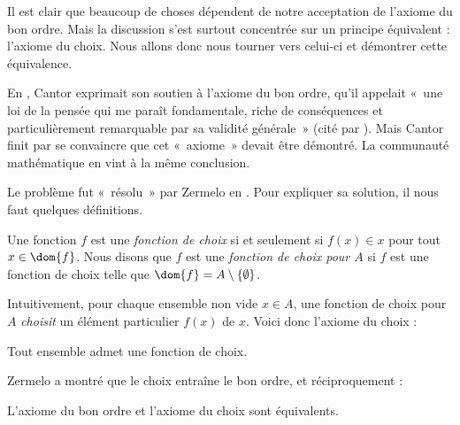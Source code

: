 \documentclass[../../../include/open-logic-section]{subfiles}
\begin{document}

Il est clair que beaucoup de choses dépendent
de notre acceptation de l'axiome du bon ordre.
Mais la discussion s'est surtout concentrée
sur un principe équivalent : l'axiome du choix.
Nous allons donc nous tourner vers celui-ci
et démontrer cette équivalence.

En \citeyear{Cantor1883}, Cantor exprimait
son soutien à l'axiome du bon ordre, qu'il
appelait «~une loi de la pensée qui me
paraît fondamentale, riche de conséquences
et particulièrement remarquable par sa
validité générale~» (cité par
\citeauthor{Potter2004}
\citeyear[p.~243]{Potter2004}).
Mais Cantor finit par se convaincre
que cet «~axiome~» devait être démontré.
La communauté mathématique en vint
à la même conclusion.

Le problème fut «~résolu~» par Zermelo
en \citeyear{Zermelo1904}. Pour expliquer
sa solution, il nous faut quelques définitions.

\begin{defn}
Une fonction $f$ est une \emph{fonction de choix}
si et seulement si $f(x) \in x$ pour tout
$x \in \dom{f}$. Nous disons que $f$ est
une \emph{fonction de choix pour $A$} si
$f$ est une fonction de choix telle que
$\dom{f} = A \setminus \{\emptyset\}$.
\end{defn}

Intuitivement, pour chaque ensemble non vide
$x \in A$, une fonction de choix pour $A$
\emph{choisit} un élément particulier
$f(x)$ de $x$. Voici donc l'axiome du choix :

\begin{axiom}[Choix]
	Tout ensemble admet une fonction de choix.
\end{axiom}

Zermelo a montré que le choix entraîne
le bon ordre, et réciproquement :

\begin{thm}[dans $\ZF$]
L'axiome du bon ordre et l'axiome du choix
sont équivalents.
\end{thm}
\end{document}
